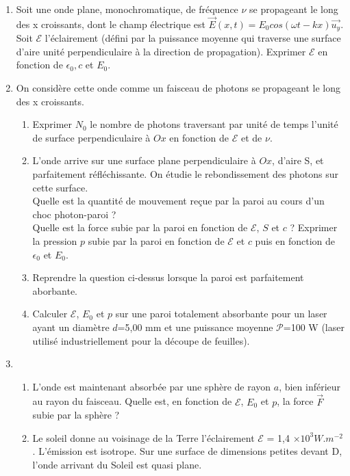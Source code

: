 \documentclass{article}
\begin{document}
\begin{enumerate}
    \item Soit une onde plane, monochromatique, de fréquence $\nu$ se propageant le long des x croissants, dont le champ électrique est $\vec{E}(x,t)=E_0cos(\omega t-kx)\vec{u_y}$. Soit  $\mathcal{E}$ l'éclairement (défini par la puissance moyenne qui traverse une surface d'aire unité perpendiculaire à la direction de propagation). Exprimer $\mathcal{E}$ en fonction de $\epsilon_0, c $ et $E_0$. 
    \item On considère cette onde comme un faisceau de photons se propageant le long des x croissants. 
    \begin{enumerate}
        \item Exprimer $N_0$ le nombre de photons traversant par unité de temps l'unité de surface perpendiculaire à $Ox$ en fonction de $\mathcal{E}$ et de $\nu$. 
        \item L'onde arrive sur une surface plane perpendiculaire à $Ox$, d'aire S, et parfaitement réfléchissante. On étudie le rebondissement des photons sur cette surface. 
        \\
        Quelle est la quantité de mouvement reçue par la paroi au cours d'un choc photon-paroi ? \\
        Quelle est la force subie par la paroi en fonction de $\mathcal{E}$, $S$ et $c$ ? 
        Exprimer la pression $p$ subie par la paroi en fonction de $\mathcal{E}$ et $c$ puis en fonction de $\epsilon_0$ et $E_0$. 
        \item Reprendre la question ci-dessus lorsque la paroi est parfaitement aborbante. 
        \item Calculer $\mathcal{E}$, $E_0$ et $p$ sur une paroi totalement absorbante pour un laser ayant un diamètre $d$=5,00 mm et une puissance moyenne $\mathcal{P}$=100 W (laser utilisé industriellement pour la découpe de feuilles). 
    \end{enumerate}
    \item 
    \begin{enumerate} 
    \item L'onde est maintenant absorbée par une sphère de rayon $a$, bien inférieur au rayon du faisceau. Quelle est, en fonction de $\mathcal{E}$, $E_0$ et $p$, la force $\vec{F}$ subie par la sphère ? 
    \item Le soleil donne au voisinage de la Terre l'éclairement $\mathcal{E}$ = 1,4 $\times 10^3 W.m^{-2}$. L'émission est isotrope. Sur une surface de dimensions petites devant D, l'onde arrivant du Soleil est quasi plane. \\

\end{enumerate}
\end{enumerate}
\end{document}
